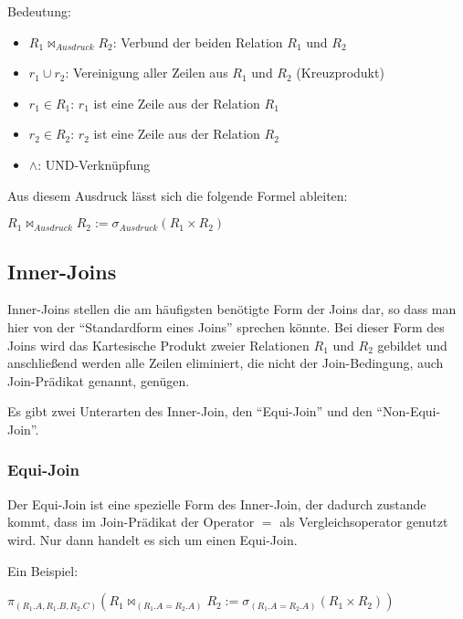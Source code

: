         Bedeutung:
        \begin{itemize}
          \item \textbf{$R_1\bowtie _{Ausdruck} R_2$}: Verbund der beiden Relation $R_1$ und $R_2$
          \item \textbf{$r_1\cup r_2$}: Vereinigung aller Zeilen aus $R_1$ und $R_2$ (Kreuzprodukt)
          \item \textbf{$r_1\in R_1$}: $r_1$ ist eine Zeile aus der Relation $R_1$
          \item \textbf{$r_2\in R_2$}: $r_2$ ist eine Zeile aus der Relation $R_2$
          \item \textbf{$\wedge$}: UND-Verkn\"upfung
        \end{itemize}

        Aus diesem Ausdruck l\"asst sich die folgende Formel ableiten:

        $R_1\bowtie _{Ausdruck} R_2 := \sigma_{Ausdruck}(R_1 \times R_2)$
\clearpage
				\subsection{Inner-Joins}
        Inner-Joins stellen die am h\"aufigsten ben\"otigte Form der Joins dar, so dass man hier von der \enquote{Standardform eines Joins} sprechen k\"onnte. Bei dieser Form des Joins wird das Kartesische Produkt zweier Relationen $R_1$ und $R_2$ gebildet und anschlie\ss{}end werden alle Zeilen eliminiert, die nicht der Join-Bedingung, auch Join-Pr\"adikat genannt, gen\"ugen.

        Es gibt zwei Unterarten des Inner-Join, den \enquote{Equi-Join} und den \enquote{Non-Equi-Join}.
        \subsubsection{Equi-Join}
          Der Equi-Join ist eine spezielle Form des Inner-Join, der dadurch zustande kommt, dass im Join-Pr\"adikat der Operator $=$ als Vergleichsoperator genutzt wird. Nur dann handelt es sich um einen Equi-Join.

          Ein Beispiel:

          $\pi _{(R_1.A, R_1.B,R_2.C)}(R_1\bowtie _{(R_1.A=R_2.A)} R_2 := \sigma _{(R_1.A=R_2.A)}(R_1 \times R_2))$

